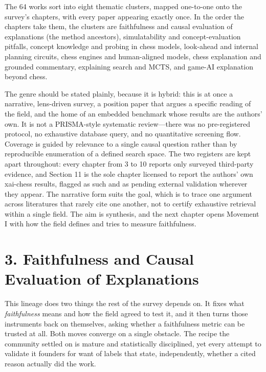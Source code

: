 \documentclass[conference]{IEEEtran}
\begin{document}
The 64 works sort into eight thematic clusters, mapped one-to-one onto the survey's chapters, with every paper appearing exactly once. In the order the chapters take them, the clusters are faithfulness and causal evaluation of explanations (the method ancestors), simulatability and concept-evaluation pitfalls, concept knowledge and probing in chess models, look-ahead and internal planning circuits, chess engines and human-aligned models, chess explanation and grounded commentary, explaining search and MCTS, and game-AI explanation beyond chess.

The genre should be stated plainly, because it is hybrid: this is at once a narrative, lens-driven survey, a position paper that argues a specific reading of the field, and the home of an embedded benchmark whose results are the authors' own. It is not a PRISMA-style systematic review---there was no pre-registered protocol, no exhaustive database query, and no quantitative screening flow. Coverage is guided by relevance to a single causal question rather than by reproducible enumeration of a defined search space. The two registers are kept apart throughout: every chapter from 3 to 10 reports only surveyed third-party evidence, and Section 11 is the sole chapter licensed to report the authors' own xai-chess results, flagged as such and as pending external validation wherever they appear. The narrative form suits the goal, which is to trace one argument across literatures that rarely cite one another, not to certify exhaustive retrieval within a single field. The aim is synthesis, and the next chapter opens Movement I with how the field defines and tries to measure faithfulness.

\section*{3. Faithfulness and Causal Evaluation of Explanations}
This lineage does two things the rest of the survey depends on. It fixes what \textit{faithfulness} means and how the field agreed to test it, and it then turns those instruments back on themselves, asking whether a faithfulness metric can be trusted at all. Both moves converge on a single obstacle. The recipe the community settled on is mature and statistically disciplined, yet every attempt to validate it founders for want of labels that state, independently, whether a cited reason actually did the work.
\end{document}
